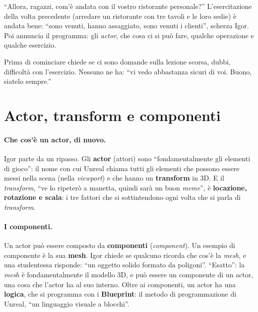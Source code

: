 ``Allora, ragazzi, com'è andata con il vostro ristorante personale?'' L'esercitazione
della volta precedente (arredare un ristorante con tre tavoli e le loro sedie) è andata
bene: ``sono venuti, hanno assaggiato, sono venuti i clienti'', scherza Igor. Poi annuncia
il programma: gli \emph{actor}, che cosa ci si può fare, qualche operazione e qualche
esercizio.

Prima di cominciare chiede se ci sono domande sulla lezione scorsa, dubbi, difficoltà
con l'esercizio. Nessuno ne ha: ``vi vedo abbastanza sicuri di voi. Buono, siatelo
sempre.''

\section{Actor, transform e componenti}
\label{ue2:sec:actor}

\paragraph{Che cos'è un actor, di nuovo.} Igor parte da un ripasso. Gli
\textbf{actor} (attori) sono ``fondamentalmente gli elementi di gioco'': il nome con cui
Unreal chiama tutti gli elementi che possono essere messi nella scena (nella
\emph{viewport}) e che hanno un \textbf{transform} in 3D. E il \emph{transform}, ``ve lo
ripeterò a manetta, quindi sarà un buon \emph{meme}'', è \textbf{locazione, rotazione e
scala}: i tre fattori che si sottintendono ogni volta che si parla di \emph{transform}.

\paragraph{I componenti.} Un actor può essere composto da \textbf{componenti}
(\emph{component}). Un esempio di componente è la sua \textbf{mesh}. Igor chiede se
qualcuno ricorda che cos'è la \emph{mesh}, e una studentessa risponde: ``un oggetto
solido formato da poligoni''. ``Esatto'': la \emph{mesh} è fondamentalmente il modello
3D, e può essere un componente di un actor, una cosa che l'actor ha al suo interno.
Oltre ai componenti, un actor ha una \textbf{logica}, che si programma con i
\textbf{Blueprint}: il metodo di programmazione di Unreal, ``un linguaggio visuale a
blocchi''.


